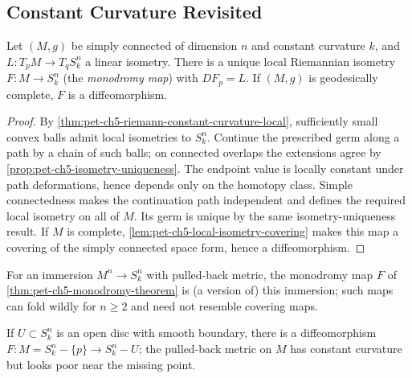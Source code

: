\subsection{Constant Curvature Revisited}

\begin{theorem}
  \label{thm:pet-ch5-monodromy-theorem}
  Let $(M,g)$ be simply connected of dimension $n$ and constant curvature $k$, and
  $L:T_pM\to T_qS^n_k$ a linear isometry. There is a unique local Riemannian
  isometry $F:M\to S^n_k$ (the \emph{monodromy map}) with $DF_p=L$. If $(M,g)$ is
  geodesically complete, $F$ is a diffeomorphism.
\end{theorem}
\begin{proof}
  \sketch
  By \cref{thm:pet-ch5-riemann-constant-curvature-local}, sufficiently small convex
  balls admit local isometries to $S_k^n$.  Continue the prescribed germ along a
  path by a chain of such balls; on connected overlaps the extensions agree by
  \cref{prop:pet-ch5-isometry-uniqueness}.  The endpoint value is locally constant
  under path deformations, hence depends only on the homotopy class.  Simple
  connectedness makes the continuation path independent and defines the required
  local isometry on all of $M$.  Its germ is unique by the same isometry-uniqueness
  result.  If $M$ is complete, \cref{lem:pet-ch5-local-isometry-covering} makes this
  map a covering of the simply connected space form, hence a diffeomorphism.
\end{proof}

\begin{example}
  \label{ex:pet-ch5-immersion-monodromy}
  For an immersion $M^n\to S^n_k$ with pulled-back metric, the monodromy map $F$ of
  \cref{thm:pet-ch5-monodromy-theorem} is (a version of) this immersion; such maps
  can fold wildly for $n\ge2$ and need not resemble covering maps.
\end{example}

\begin{example}
  \label{ex:pet-ch5-folding-immersion}
  If $U\subset S^n_k$ is an open disc with smooth boundary, there is a
  diffeomorphism $F:M=S^n_k-\{p\}\to S^n_k-U$; the pulled-back metric on $M$ has
  constant curvature but looks poor near the missing point.
\end{example}

